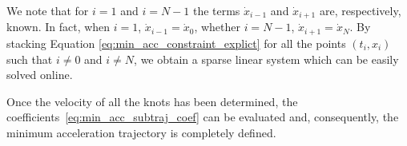 We note that for $i=1$ and $i=N-1$ the terms $\dot{x}_{i-1}$ and $\dot{x}_{i+1}$ are, respectively, known. In fact, when $i=1$, $\dot{x}_{i-1} = \dot{x}_{0}$, whether $i=N-1$, $\dot{x}_{i+1} = \dot{x}_{N}$.
By stacking Equation \eqref{eq:min_acc_constraint_explict} for all the points $(t_i, x_i)$ such that $i \ne 0$ and $i \ne N$, we obtain a sparse linear system which can be easily solved online.
\par
Once the velocity of all the knots has been determined, the coefficients~\eqref{eq:min_acc_subtraj_coef} can be evaluated and, consequently, the minimum acceleration trajectory is completely defined. 
